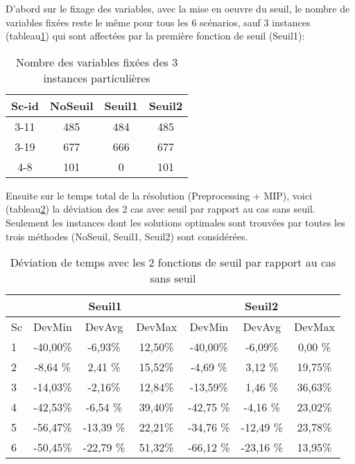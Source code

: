 \documentclass[twoside,fleqn]{EPURapport}
\begin{document}
D'abord sur le fixage des variables, avec la mise en oeuvre du seuil, le nombre de variables fixées reste le même pour tous les 6 scénarios, sauf 3 instances (tableau\ref{tab_cut2_seuil_fix_cmp}) qui sont affectées par la première fonction de seuil (Seuil1):
\begin{table}[h]
    \centering
    \begin{tabular}{|c|c|c|c|}
    	\hline
Sc-id& 	NoSeuil	& Seuil1	& Seuil2\\ \hline
3-11 & 	485	& 484	& 485      \\ \hline
3-19 & 	677	& 666	& 677      \\ \hline
4-8 & 	101	& 0	& 101     		\\ \hline
    \end{tabular}
    \caption{Nombre des variables fixées des 3 instances particulières}
    \label{tab_cut2_seuil_fix_cmp}
\end{table}
\bigskip

Ensuite sur le temps total de la résolution (Preprocessing + MIP), voici (tableau\ref{tab_cut2_seuil_tim_cmp}) la déviation des 2 cas avec seuil par rapport au cas sans seuil. Seulement les instances dont les solutions optimales sont trouvées par toutes les trois méthodes (NoSeuil, Seuil1, Seuil2) sont considérées.
\begin{table}[h]
    \centering
    \begin{tabular}{|l|c|c|c|c|c|c|}
    	\hline
  &\multicolumn{3}{c}{Seuil1}	&\multicolumn{3}{|c|}{Seuil2}\\ \hline
 Sc  & 	DevMin	& DevAvg	& DevMax& 	DevMin	& DevAvg	&DevMax  \\ \hline
1&	-40,00\%&	-6,93\%&	12,50\%&	-40,00\%&	-6,09\%&	0,00 \%    \\ \hline
2&	-8,64 \%&	2,41 \%&	15,52\%&	-4,69 \%&	3,12 \%&	19,75\%     \\ \hline
3&	-14,03\%&	-2,16\%&	12,84\%&	-13,59\%&	1,46 \%&	36,63\%  \\ \hline
4 & -42,53\%	&	-6,54	\% &39,40\% &	-42,75	\% &-4,16	\% &23,02\%    \\ \hline
5 & -56,47\%	&	-13,39	\% &22,21\% &	-34,76	\% &-12,49	\% &23,78\%     \\ \hline
6  & -50,45\%	&	-22,79	\%& 51,32\%& 	-66,12	\%& -23,16	\%& 13,95\%  \\ \hline
    \end{tabular}
    \caption{Déviation de temps avec les 2 fonctions de seuil par rapport au cas sans seuil}
    \label{tab_cut2_seuil_tim_cmp}
    
\end{table}
\bigskip
\end{document}
